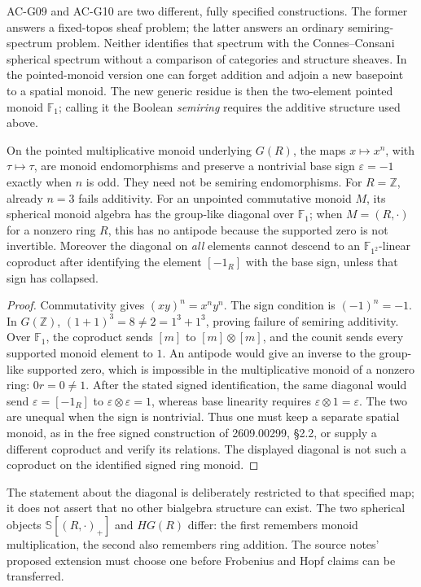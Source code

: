 AC-G09 and AC-G10 are two different, fully specified constructions.
The former answers a fixed-topos sheaf problem; the latter answers an
ordinary semiring-spectrum problem.  Neither identifies that spectrum
with the Connes--Consani spherical spectrum without a comparison of
categories and structure sheaves.  In the pointed-monoid version one can
forget addition and adjoin a new basepoint to a spatial monoid.  The new
generic residue is then the two-element pointed monoid $\mathbb F_1$;
calling it the Boolean \emph{semiring} requires the additive structure
used above.

\begin{proposition}
\label{AC-G11}
On the pointed multiplicative monoid underlying $G(R)$, the maps
$x\mapsto x^n$, with $\tau\mapsto\tau$, are monoid endomorphisms and
preserve a nontrivial base sign $\varepsilon=-1$ exactly when $n$ is odd.
They need not be semiring endomorphisms.  For $R=\mathbb Z$, already
$n=3$ fails additivity.
For an unpointed commutative monoid $M$, its spherical monoid algebra
has the group-like diagonal over $\mathbb F_1$; when $M=(R,\cdot)$ for a nonzero ring $R$, this
has no antipode because the supported zero is not invertible.
Moreover the diagonal on \emph{all} elements cannot descend to an
$\mathbb F_{1^2}$-linear coproduct after identifying the element
$[-1_R]$ with the base sign, unless that sign has collapsed.
\end{proposition}
\begin{proof}
Commutativity gives $(xy)^n=x^ny^n$.  The sign condition is
$(-1)^n=-1$.  In $G(\mathbb Z)$,
$(1+1)^3=8\ne2=1^3+1^3$, proving failure of semiring additivity.
Over $\mathbb F_1$, the coproduct sends $[m]$ to $[m]\otimes[m]$,
and the counit sends every supported monoid element to $1$.
An antipode would give an inverse to the group-like supported zero,
which is impossible in the multiplicative monoid of a nonzero ring:
$0r=0\ne1$.  After the stated signed identification, the same diagonal
would send $\varepsilon=[-1_R]$ to
$\varepsilon\otimes\varepsilon=1$, whereas base linearity requires
$\varepsilon\otimes1=\varepsilon$.  The two are unequal when the sign
is nontrivial.  Thus one must keep a separate spatial monoid, as in the
free signed construction of 2609.00299, \S2.2, or supply a different
coproduct and verify its relations.  The displayed diagonal is not such
a coproduct on the identified signed ring monoid.
\end{proof}

The statement about the diagonal is deliberately restricted to that
specified map; it does not assert that no other bialgebra structure can
exist.  The two spherical objects
$\mathbb S[(R,\cdot)_+]$ and $HG(R)$ differ: the first remembers monoid
multiplication, the second also remembers ring addition.  The source
notes' proposed extension must choose one before Frobenius and Hopf claims
can be transferred.

